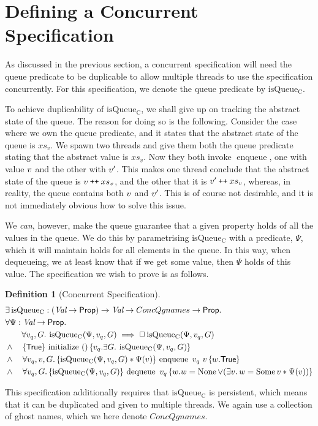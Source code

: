 \documentclass[a4paper, 10pt]{report}
\theoremstyle{definition}
\newtheorem{definition}{Definition}[section]
\newcommand{\initialise}{\operatorname{initialize}}
\newcommand{\enqueue}{\operatorname{enqueue}}
\newcommand{\dequeue}{\operatorname{dequeue}}
\newcommand{\isqueueconc}{\operatorname{isQueue_{C}}}
\newcommand{\ConcQgnames}{ConcQgnames}
\newcommand{\vq}{v_q}
\newcommand{\nodeval}{\valB}
\newcommand{\absvalue}{\val}
\newcommand{\absvalueList}{xs_v}
\newcommand{\Qg}{G}
\newcommand\catenate{\mathbin{\text{\ttfamily\upshape ++}}}
\newcommand{\concspecinitHTGen}[3]{\hoare{\TRUE}{\initialise \ \TT}{#2 . \Exists #3. \isqueueconc(#1, #2, #3)}}
\newcommand{\concspecinitGen}[3]{\concspecinitHTGen{#1}{#2}{#3}}
\newcommand{\concspecinit}[1]{\concspecinitGen{#1}{\vq}{\Qg}}
\newcommand{\concspecenqHT}[4]{\hoare{\isqueueconc(#1, #2, #4) \star{} #1(#3)}{\enqueue \ #2 \ #3}{\valB . \TRUE}}
\newcommand{\concspecenqGen}[4]{\All #2, #3, #4. \concspecenqHT{#1}{#2}{#3}{#4}}
\newcommand{\concspecenq}[1]{\concspecenqGen{#1}{\vq}{\absvalue}{\Qg}}
\newcommand{\concspecdeqHT}[3]{\hoare{\isqueueconc(#1, #2, #3)}{\dequeue \ #2}{\nodeval . \nodeval = \None \lor{} (\Exists \absvalue . \nodeval = \Some \absvalue \star{} #1(\absvalue))}}
\newcommand{\concspecdeqGen}[3]{\All #2, #3. \concspecdeqHT{#1}{#2}{#3}}
\newcommand{\concspecdeq}[1]{\concspecdeqGen{#1}{\vq}{\Qg}}
\begin{document}
\section{Defining a Concurrent Specification}
\label{QueueSpecs:section:conc}

As discussed in the previous section, a concurrent specification will need the queue predicate to be duplicable to allow multiple threads to use the specification concurrently. For this specification, we denote the queue predicate by $\isqueueconc$.

To achieve duplicability of $\isqueueconc$, we shall give up on tracking the abstract state of the queue. The reason for doing so is the following. Consider the case where we own the queue predicate, and it states that the abstract state of the queue is $\absvalueList$. We spawn two threads and give them both the queue predicate stating that the abstract value is $\absvalueList$. Now they both invoke $\enqueue$, one with value $\absvalue$ and the other with $\absvalue'$. This makes one thread conclude that the abstract state of the queue is $\absvalue \catenate \absvalueList$, and the other that it is $\absvalue' \catenate \absvalueList$, whereas, in reality, the queue contains both $\absvalue$ and $\absvalue'$. This is of course not desirable, and it is not immediately obvious how to solve this issue.

We \textit{can}, however, make the queue guarantee that a given property holds of all the values in the queue. We do this by parametrising $\isqueueconc$ with a predicate, $\Psi$, which it will maintain holds for all elements in the queue. In this way, when dequeueing, we at least know that if we get some value, then $\Psi$ holds of this value. The specification we wish to prove is as follows.
\begin{definition}[Concurrent Specification]\label{QueueSpecs:spec:conc}
\begin{align*}
  &\Exists \isqueueconc : (\Val \to \Prop) \to \Val \to \ConcQgnames \to \Prop.\\
  &\All \Psi : \Val \to \Prop.\\
  &\quad\quad \All \vq, \Qg . \isqueueconc(\Psi, \vq, \Qg) \implies \persistently \isqueueconc(\Psi, \vq, \Qg)\\
  &\land{}\quad\concspecinit{\Psi}\\
  &\land{}\quad\concspecenq{\Psi}\\
  &\land{}\quad\concspecdeq{\Psi}
\end{align*}
\end{definition}
This specification additionally requires that $\isqueueconc$ is persistent, which means that it can be duplicated and given to multiple threads. We again use a collection of ghost names, which we here denote $\ConcQgnames$.
\end{document}
